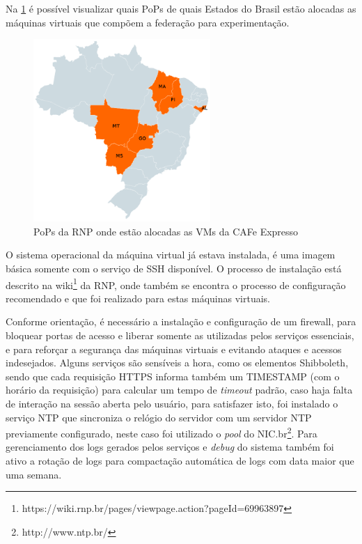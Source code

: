 Na \ref{fig_9} é possível visualizar quais PoPs de quais Estados do Brasil estão alocadas as máquinas virtuais que compõem a federação para experimentação.

\begin{figure}[!htpb]
 \centering
 \includegraphics[width=0.6\textwidth]{figuras/mapa-vms.png}
 \caption{PoPs da RNP onde estão alocadas as VMs da CAFe Expresso}
 \label{fig_9}
\end{figure}

O sistema operacional da máquina virtual já estava instalada, é uma imagem básica somente com o serviço de \ac{SSH} disponível. O processo de instalação está descrito na wiki\footnote{https://wiki.rnp.br/pages/viewpage.action?pageId=69963897} da RNP, onde também se encontra o processo de configuração recomendado e que foi realizado para estas máquinas virtuais.

Conforme orientação, é necessário a instalação e configuração de um firewall, para bloquear portas de acesso e liberar somente as utilizadas pelos serviços essenciais, e para reforçar a segurança das máquinas virtuais e evitando ataques e acessos indesejados. Alguns serviços são sensíveis a hora, como os elementos Shibboleth, sendo que cada requisição HTTPS informa também um TIMESTAMP (com o horário da requisição) para calcular um tempo de \textit{timeout} padrão, caso haja falta de interação na sessão aberta pelo usuário, para satisfazer isto, foi instalado o serviço NTP que sincroniza o relógio do servidor com um servidor \acs{NTP} previamente configurado, neste caso foi utilizado o \textit{pool} do NIC.br\footnote{http://www.ntp.br/}. Para gerenciamento dos logs gerados pelos serviços e \textit{debug} do sistema também foi ativo a rotação de logs para compactação automática de logs com data maior que uma semana.

